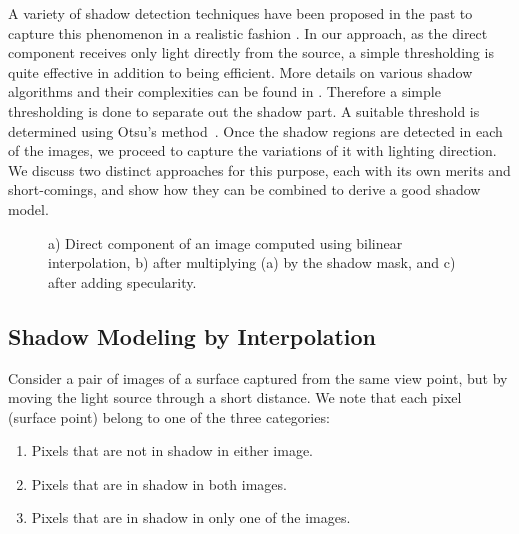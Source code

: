 A variety of shadow detection techniques have been proposed in the past to
capture this phenomenon in a realistic fashion \cite{chap3-3,chap3-4,chap3-5,chap3-6}. In our
approach, as the direct component receives only light directly from the source,
a simple thresholding is quite effective in addition to being efficient. More
details on various shadow algorithms and their complexities can be found in
\cite{chap3-2}. Therefore a simple thresholding is done to separate out the shadow part. 
A suitable threshold is determined using Otsu's method~\cite{A2}.
Once the shadow regions are detected in each of the images, we
proceed to capture the variations of it with lighting direction. We discuss two
distinct approaches for this purpose, each with its own merits and
short-comings, and show how they can be combined to derive a good shadow model.




\begin{figure}[t]
\centering {}  \subfigure[]{
\texttt{[image: image\_eps/shadow\_classify/thresh=110.eps]}
\label{fig:subfig3} } \caption{a) Direct component of an image computed using
bilinear interpolation, b) after multiplying (a) by the shadow mask, and c)
after adding specularity.}
\label{fig:mask}
\end{figure}




\subsection{Shadow Modeling by Interpolation}
Consider a pair of images of a surface captured from the same view point, but by
moving the light source through a short distance. We note that each pixel
(surface point) belong to one of the three categories:
\begin{enumerate}
\item Pixels that are not in shadow in either image.
\item Pixels that are in shadow in both images.
\item Pixels that are in shadow in only one of the images.
\end{enumerate}

